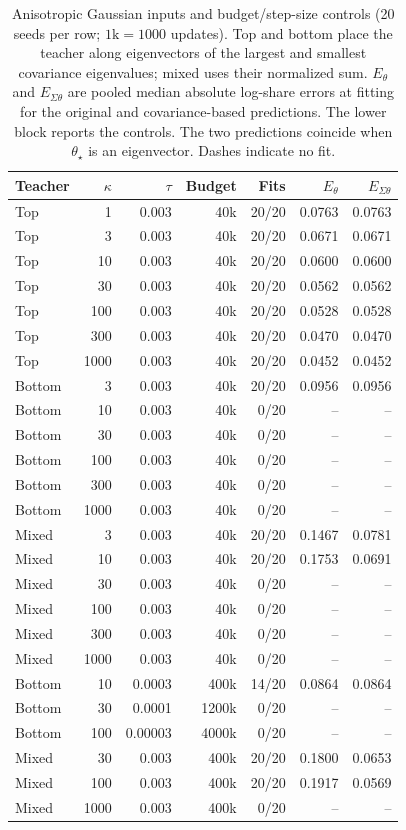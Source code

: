 \begin{table}[htbp]
\centering
\small
\setlength{\tabcolsep}{4pt}
\begin{tabular}{lrrrrrr}
\toprule
Teacher & $\kappa$ & $\tau$ & Budget & Fits & $E_\theta$ & $E_{\Sigma\theta}$ \\
\midrule
Top & 1 & 0.003 & 40k & 20/20 & 0.0763 & 0.0763 \\
Top & 3 & 0.003 & 40k & 20/20 & 0.0671 & 0.0671 \\
Top & 10 & 0.003 & 40k & 20/20 & 0.0600 & 0.0600 \\
Top & 30 & 0.003 & 40k & 20/20 & 0.0562 & 0.0562 \\
Top & 100 & 0.003 & 40k & 20/20 & 0.0528 & 0.0528 \\
Top & 300 & 0.003 & 40k & 20/20 & 0.0470 & 0.0470 \\
Top & 1000 & 0.003 & 40k & 20/20 & 0.0452 & 0.0452 \\
Bottom & 3 & 0.003 & 40k & 20/20 & 0.0956 & 0.0956 \\
Bottom & 10 & 0.003 & 40k & 0/20 & -- & -- \\
Bottom & 30 & 0.003 & 40k & 0/20 & -- & -- \\
Bottom & 100 & 0.003 & 40k & 0/20 & -- & -- \\
Bottom & 300 & 0.003 & 40k & 0/20 & -- & -- \\
Bottom & 1000 & 0.003 & 40k & 0/20 & -- & -- \\
Mixed & 3 & 0.003 & 40k & 20/20 & 0.1467 & 0.0781 \\
Mixed & 10 & 0.003 & 40k & 20/20 & 0.1753 & 0.0691 \\
Mixed & 30 & 0.003 & 40k & 0/20 & -- & -- \\
Mixed & 100 & 0.003 & 40k & 0/20 & -- & -- \\
Mixed & 300 & 0.003 & 40k & 0/20 & -- & -- \\
Mixed & 1000 & 0.003 & 40k & 0/20 & -- & -- \\
\midrule
Bottom & 10 & 0.0003 & 400k & 14/20 & 0.0864 & 0.0864 \\
Bottom & 30 & 0.0001 & 1200k & 0/20 & -- & -- \\
Bottom & 100 & 0.00003 & 4000k & 0/20 & -- & -- \\
Mixed & 30 & 0.003 & 400k & 20/20 & 0.1800 & 0.0653 \\
Mixed & 100 & 0.003 & 400k & 20/20 & 0.1917 & 0.0569 \\
Mixed & 1000 & 0.003 & 400k & 0/20 & -- & -- \\
\bottomrule
\end{tabular}
\caption{Anisotropic Gaussian inputs and budget/step-size controls (20 seeds per row; $1\mathrm{k}=1000$ updates). Top and bottom place the teacher along eigenvectors of the largest and smallest covariance eigenvalues; mixed uses their normalized sum. $E_\theta$ and $E_{\Sigma\theta}$ are pooled median absolute log-share errors at fitting for the original and covariance-based predictions. The lower block reports the controls. The two predictions coincide when $\theta_\star$ is an eigenvector. Dashes indicate no fit.}
\label{tab:h-anisotropic}
\end{table}
